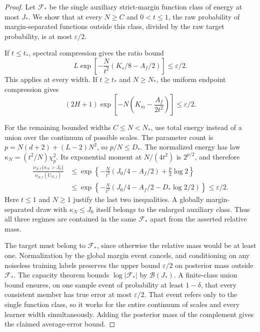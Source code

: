\begin{proof}
Let $\mathcal F_*$ be the single auxiliary strict-margin function class
of energy at most $J_*$. We show that at every $N\ge C$ and $0<t\le1$,
the raw probability of margin-separated functions outside this class,
divided by the raw target probability, is at most $\varepsilon/2$.

If $t\le t_*$, spectral compression gives the ratio bound
\[
 L\exp\left[-\frac N{t^2}(K_s/8-A_f/2)\right]
 \le\varepsilon/2.
\]
This applies at every width.
If $t\ge t_*$ and $N\ge N_*$, the uniform endpoint compression gives
\[
 (2H+1)\exp\left[-N\left(K_m-\frac{A_f}{2t^2}\right)\right]
 \le\varepsilon/2.
\]

For the remaining bounded widths $C\le N<N_*$, use total energy instead
of a union over the continuum of possible scales. The parameter count is
$p=N(d+2)+(L-2)N^2$, so $p/N\le D_*$. The normalized energy has law
$\kappa_N=(t^2/N)\chi_p^2$. Its exponential moment at $N/(4t^2)$ is
$2^{p/2}$, and therefore
\begin{align*}
 \frac{\nu_{N,t}\{\kappa_N>J_0\}}{\nu_{N,t}(U_{N,f})}
 &\le \exp\left\{-\frac N{t^2}(J_0/4-A_f/2)
                                      +\frac p2\log2\right\}\\
 &\le \exp\left\{-\frac N{t^2}
                  (J_0/4-A_f/2-D_*\log2/2)\right\}
 \le\varepsilon/2.
\end{align*}
Here $t\le1$ and $N\ge1$ justify the last two inequalities. A globally
margin-separated draw with $\kappa_N\le J_0$ itself belongs to the
enlarged auxiliary class. Thus all three regimes are contained in the
same $\mathcal F_*$ apart from the asserted relative mass.

The target must belong to $\mathcal F_*$, since otherwise the relative
mass would be at least one. Normalization by the global margin event
cancels, and conditioning on any noiseless training labels preserves the
upper bound $\varepsilon/2$ on posterior mass outside $\mathcal F_*$.
The capacity theorem bounds $\log|\mathcal F_*|$ by
$\mathcal B(J_*)$. A finite-class union bound ensures, on one sample
event of probability at least $1-\delta$, that every consistent member
has true error at most $\varepsilon/2$. That event refers only to the
single function class, so it works for the entire continuum of scales
and every learner width simultaneously. Adding the posterior mass of
the complement gives the claimed average-error bound.
\end{proof}
